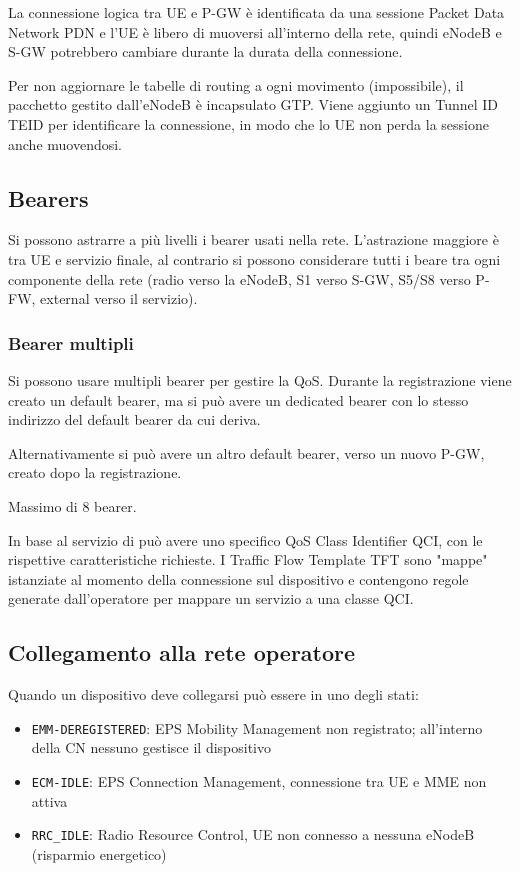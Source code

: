 La connessione logica tra UE e P-GW è identificata da una sessione Packet Data Network PDN e l'UE è libero di muoversi all'interno della rete, quindi eNodeB e S-GW potrebbero cambiare durante la durata della connessione.

Per non aggiornare le tabelle di routing a ogni movimento (impossibile), il pacchetto gestito dall'eNodeB è incapsulato GTP. Viene aggiunto un Tunnel ID TEID per identificare la connessione, in modo che lo UE non perda la sessione anche muovendosi.

\subsection{Bearers}

Si possono astrarre a più livelli i bearer usati nella rete. L'astrazione maggiore è tra UE e servizio finale, al contrario si possono considerare tutti i beare tra ogni componente della rete (radio verso la eNodeB, S1 verso S-GW, S5/S8 verso P-FW, external verso il servizio).

\subsubsection{Bearer multipli}

Si possono usare multipli bearer per gestire la QoS. Durante la registrazione viene creato un default bearer, ma si può avere un dedicated bearer con lo stesso indirizzo del default bearer da cui deriva. 

Alternativamente si può avere un altro default bearer, verso un nuovo P-GW, creato dopo la registrazione. 

Massimo di 8 bearer.

In base al servizio di può avere uno specifico QoS Class Identifier QCI, con le rispettive caratteristiche richieste. I Traffic Flow Template TFT sono "mappe" istanziate al momento della connessione sul dispositivo e contengono regole generate dall'operatore per mappare un servizio a una classe QCI.

\subsection{Collegamento alla rete operatore}

Quando un dispositivo deve collegarsi può essere in uno degli stati: 
\begin{itemize}
    \item \texttt{EMM-DEREGISTERED}: EPS Mobility Management non registrato; all'interno della CN nessuno gestisce il dispositivo 
    
    \item \texttt{ECM-IDLE}: EPS Connection Management, connessione tra UE e MME non attiva
    
    \item \texttt{RRC\_IDLE}: Radio Resource Control, UE non connesso a nessuna eNodeB (risparmio energetico)
\end{itemize}

